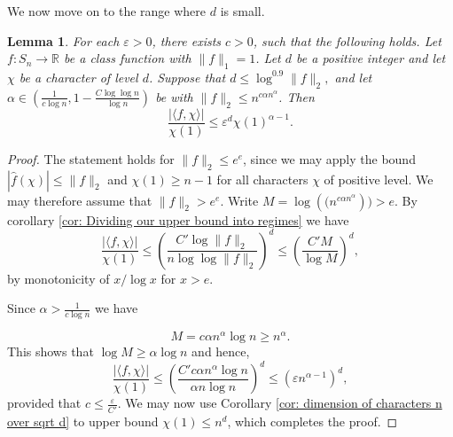 \documentclass[11pt, letterpaper]{amsart}
\newtheorem{lem}[thm]{Lemma}
\newcommand{\remove}[1]{}
\newcommand\eps{\varepsilon}
\renewcommand\ge{\geqslant}
\renewcommand\le{\leqslant}
\renewcommand{\epsilon}{\eps}
\begin{document}
\remove{
\begin{lem}\label{lem:largest degree variant}
For each $\omega>0$, there exists $n_0,C>0$
such that the following holds. Let $n>n_0$, $\alpha\in(\frac{C}{\omega\log n},1)$, and let $f\colon S_n \to \mathbb{R}$ be a function with $\|f\|_1=1$ and 
\[\|f\|_2\le e^{n^{1/3}}.\]
Let $d>\frac{C\log\|f\|_2}{\log n}$ be a natural number and let $\chi$ be a character of level $d$. Then 
\[ \frac{\left|\langle f, \chi\rangle\right|}{\chi(1)} \le \chi(1)^{\alpha -1} \|f\|_2^{-\omega}.
\]
\end{lem}
\begin{proof}
     Let $M= \frac{\omega C\log\|f\|_2}{ \alpha \log n}$. 
     We have $\chi(1) \ge \left(\frac{n}{eM}\right)^{M}\ge n^{M/2}$ 
     by Theorem \ref{thm:EFP dimensions of representations}. We also have $\frac{\left|\langle f, \chi\rangle\right|}{\chi(1)} \le \frac{\|f\|_2}{\chi(1)},$ which shows that \[\frac{\left|\langle f, \chi\rangle\right|}{\chi(1)} \le \chi(1)^{\alpha -1} \frac{\|f\|_2}{\chi(1)^{\alpha}}\le \chi(1)^{\alpha-1}\|f\|_2 n^{-\alpha M/2} \le  \chi(1)^{\alpha-1}\|f\|_2^{-100}.\]  
\end{proof}
}

We now move on to the range where $d$ is small.

\begin{lem}\label{lem: smallest degree}
 For each $\epsilon>0$, there exists $c>0$, such that the following holds. Let $f\colon S_n \to \mathbb{R}$ be a class function with $\|f\|_1=1$. Let $d$ be a positive integer and let $\chi$ be a character of level $d$. Suppose that $d \le \log^{0.9}\|f\|_2,$ and let $\alpha\in \left( \frac{1}{c\log n}, 1 - \frac{C\log \log n}{\log n}\right)$ be with  $\|f\|_2 \le n^{c\alpha n^{\alpha}}$. Then
\[ \frac{|\langle f, \chi \rangle|}{\chi(1)} \le \epsilon^{d}\chi(1)^{\alpha - 1}.\]
\end{lem}

\begin{proof}
    The statement holds for $\|f\|_2 \le e^e$, since we may apply the bound $|\hat{f}(\chi)|\le \|f\|_2$ and $\chi(1)\ge n-1$ for all characters $\chi$ of positive level.  We may therefore assume that  $\|f\|_2 > e^e$.
Write $M = \log\left((n^{c\alpha n^{\alpha}}\right)) > e.$
    By corollary \ref{cor: Dividing our upper bound into regimes} we have
    \[
    \frac{|\langle f, \chi \rangle|}{\chi(1)} \le \left(\frac{C'\log\|f\|_2}{n\log\log\|f\|_2}\right)^d \le \left(\frac{C' M}{\log M}\right)^d,
    \]
    by monotonicity of $x/\log x$ for $x>e$.
    
Since 
$\alpha>\frac{1}{c\log n}$ we have

    \[ M = c\alpha n^{\alpha} \log n \ge n^{\alpha}. \]
    This shows that $\log M\ge \alpha\log n$
and hence,     
    \[
    \frac{|\langle f, \chi \rangle|}{\chi(1)}  \le \left(\frac{C'c\alpha n^{\alpha}\log n}{\alpha n \log n}\right)^d \le \left(\epsilon   n^{\alpha-1}\right)^d, 
    \]
    provided that $c\le \frac{\epsilon}{C'}$.
    We may now use Corollary \ref{cor: dimension of characters n over sqrt d} to upper bound $\chi(1)\le n^d$, which completes the proof.
\end{proof}
\end{document}
